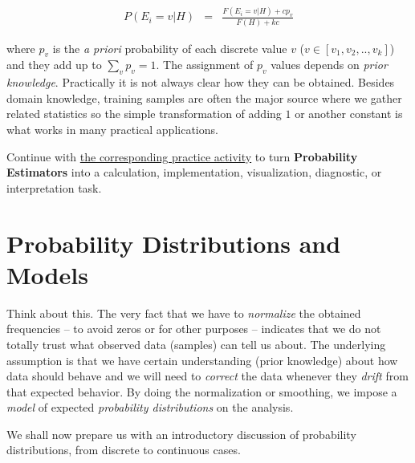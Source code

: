 \documentclass[
  letterpaper,
]{scrbook}
\begin{document}
\[\begin{aligned}
P(E_i = v | H) & = & \frac{F(E_i=v | H) + c p_v}{F(H) + k c}
\end{aligned}\]

where \(p_v\) is the \emph{a priori} probability of each discrete value
\(v\) (\(v \in [v_1, v_2, .., v_k]\)) and they add up to
\(\sum_v p_v = 1\). The assignment of \(p_v\) values depends on
\emph{prior knowledge}. Practically it is not always clear how they can
be obtained. Besides domain knowledge, training samples are often the
major source where we gather related statistics so the simple
transformation of adding \(1\) or another constant is what works in many
practical applications.

\begin{tcolorbox}[enhanced jigsaw, arc=.35mm, bottomrule=.15mm, bottomtitle=1mm, breakable, colback=white, colbacktitle=quarto-callout-tip-color!10!white, colframe=quarto-callout-tip-color-frame, coltitle=black, left=2mm, leftrule=.75mm, opacityback=0, opacitybacktitle=0.6, rightrule=.15mm, title=\textcolor{quarto-callout-tip-color}{\faLightbulb}\hspace{0.5em}{Put it into practice}, titlerule=0mm, toprule=.15mm, toptitle=1mm]

Continue with \hyperref[sec-pr-04-probability-estimators]{the
corresponding practice activity} to turn \textbf{Probability Estimators}
into a calculation, implementation, visualization, diagnostic, or
interpretation task.

\end{tcolorbox}

\section{Probability Distributions and
Models}\label{probability-distributions-and-models}

Think about this. The very fact that we have to \emph{normalize} the
obtained frequencies -- to avoid zeros or for other purposes --
indicates that we do not totally trust what observed data (samples) can
tell us about. The underlying assumption is that we have certain
understanding (prior knowledge) about how data should behave and we will
need to \emph{correct} the data whenever they \emph{drift} from that
expected behavior. By doing the normalization or smoothing, we impose a
\emph{model} of expected \emph{probability distributions} on the
analysis.

We shall now prepare us with an introductory discussion of probability
distributions, from discrete to continuous cases.
\end{document}

